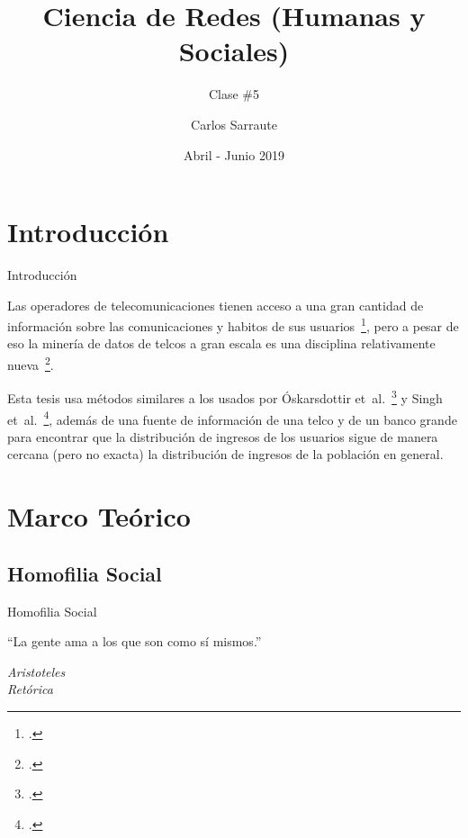 \documentclass[usenames,dvipsnames,table]{beamer}
\title[Ciencia de Redes]{Ciencia de Redes (Humanas y Sociales)}
\subtitle{Clase \#5}
\author{Carlos Sarraute}
\date{Abril - Junio 2019}
\institute[Grandata]{Grandata}
\begin{document}
\begin{frame}
	\hypersetup{pageanchor=false}
	\titlepage{} 
	\hypersetup{pageanchor=true}
\end{frame}

\section{Introducción}


\begin{frame}{Introducción}

	Las operadores de telecomunicaciones tienen acceso a una gran cantidad de información sobre las comunicaciones y habitos de sus usuarios~\footcite{huurdeman2003}, pero a pesar de eso la minería de datos de telcos a gran escala es una disciplina relativamente nueva~\footcite{han2002emerging}.

	Esta tesis usa métodos similares a los usados por Óskarsdottir et~al.~\footcite{oskarsdottir2016} y Singh et~al.~\footcite{singh2013predicting}, además de una fuente de información de una telco y de un banco grande para encontrar que la distribución de ingresos de los usuarios sigue de manera cercana (pero no exacta) la distribución de ingresos de la población en general.
\end{frame}

\section{Marco Teórico}

\subsection{Homofilia Social}

\begin{frame}{Homofilia Social}
	\epigraph{``La gente ama a los que son como sí mismos.''}{\textit{Aristoteles \\ Retórica}}
\end{frame}
\end{document}
